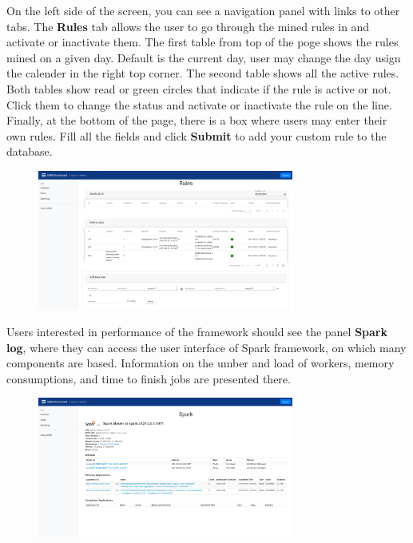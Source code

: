 \documentclass[a4paper]{article} %
\begin{document}
On the left side of the screen, you can see a navigation panel with links to other tabs. The \textbf{Rules} tab allows the user to go through the mined rules in and activate or inactivate them. The first table from top of the poge shows the rules mined on a given day. Default is the current day, user may change the day usign the calender in the right top corner. The second table shows all the active rules. Both tables show read or green circles that indicate if the rule is active or not. Click them to change the status and activate or inactivate the rule on the line. Finally, at the bottom of the page, there is a box where users may enter their own rules. Fill all the fields and click \textbf{Submit} to add your custom rule to the database.

\begin{figure}[h]
  \centering
  \includegraphics[width=0.75\textwidth]{fig/dashboard_rules}
\end{figure}

Users interested in performance of the framework should see the panel \textbf{Spark log}, where they can access the user interface of Spark framework, on which many components are based. Information on the umber and load of workers, memory consumptions, and time to finish jobs are presented there.

\begin{figure}[h]
  \centering
  \includegraphics[width=0.75\textwidth]{fig/dashboard_spark}
\end{figure}
\end{document}
